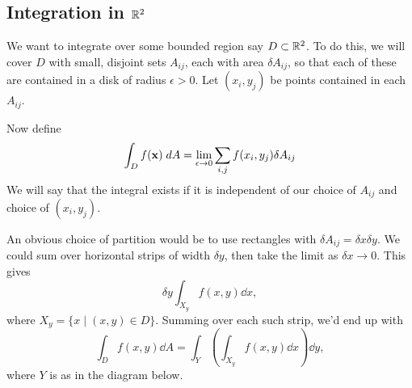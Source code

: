 \documentclass[a4paper]{scrartcl}
\begin{document}
\subsection{Integration in $\mathbb{R}^2$}

We want to integrate over some bounded region say $D \subset \mathbb{R}^2$. To do this, we will cover $D$ with small, disjoint sets $A_{ij}$, each with area $\delta A_{ij}$, so that each of these are contained in a disk of radius $\epsilon > 0$.
Let $(x_i, y_j)$ be points contained in each $A_{ij}$.

Now define
$$
	\int_D f(\mathbf{x}) \; d A = \lim_{\epsilon \to 0} \sum_{i,j} f(x_i, y_j) \delta A_{ij}
$$
We will say that the integral exists if it is independent of our choice of $A_{ij}$ and choice of $(x_i, y_j)$.

An obvious choice of partition would be to use rectangles with $\delta A_{ij} = \delta x \delta y$. We could sum over horizontal strips of width $\delta y$, then take the limit as $\delta x \rightarrow 0$. This gives
$$
	\delta y \int_{X_y} f(x, y) \dd x,
$$
where $X_y = \{x \mid (x, y) \in D \}$. Summing over each such strip, we'd end up with
$$
\int_{D} f(x, y) \dd A = \int_Y \left(\int_{X_y} f(x, y) \dd x\right) \dd y,
$$
where $Y$ is as in the diagram below.
\end{document}
